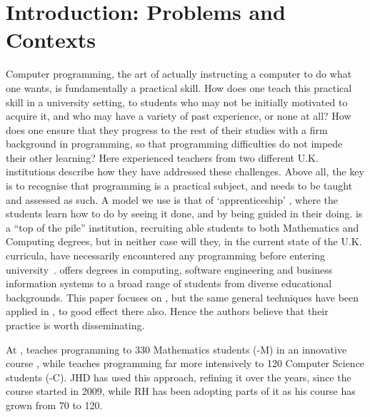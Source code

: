 \documentclass[conference,compsoc]{IEEEtran}
\begin{document}




%
\IEEEpeerreviewmaketitle



\section{Introduction: Problems and Contexts}
Computer programming, the art of actually instructing a computer to do what one wants, is fundamentally a practical skill. How does one teach this practical skill in a university setting, to students who may not be initially motivated to acquire it, and who may have a variety of past experience, or none at all? How does one ensure that they progress to the rest of their studies with a firm background in programming, so that programming difficulties do not impede their other learning? Here experienced teachers from two different U.K. institutions describe how they have addressed these challenges. Above all, the key is to recognise that programming is a practical subject, and needs to be taught and assessed as such. A model we use is that of `apprenticeship' \cite{Viha}, where the students learn how to do by seeing it done, and by being guided in their doing. \Bath{} is a ``top of the pile'' institution, recruiting able students to both Mathematics and Computing degrees, but in neither case will they, in the current state of the U.K. curricula, have necessarily encountered any programming before entering university~\cite{brown-et-al-toce2014}. \Cardiff{} offers degrees in computing, software engineering and business information systems to a broad range of students from diverse educational backgrounds. This paper focuses on \Bath{}, but the same general techniques have been applied in \Cardiff{}, to good effect there also. Hence the authors believe that their practice is worth disseminating.

At \Bath, \JHD{} teaches programming to 330 Mathematics students (\Bath-M) in an innovative course \cite{XX}, while \RH{} teaches programming far more intensively to 120 Computer Science students (\Bath-C). JHD has used this approach, refining it over the years, since the course started in 2009, while RH has been adopting parts of  it as his course has grown from 70 to 120.
\end{document}
